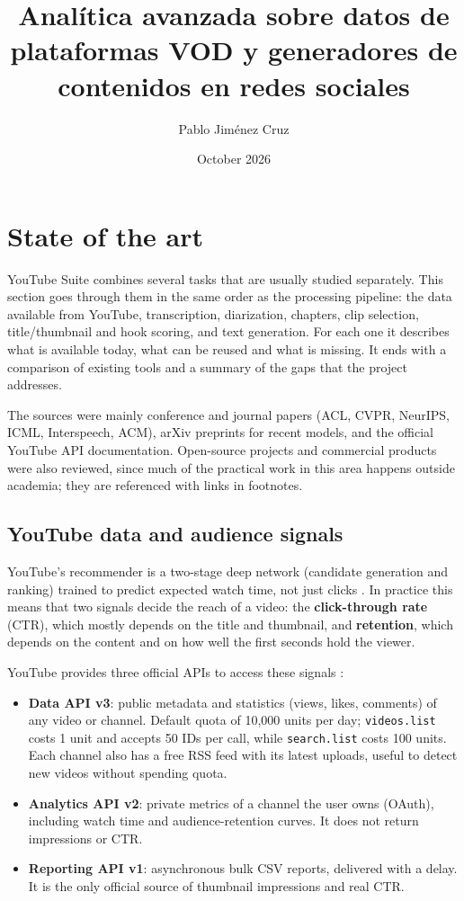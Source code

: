 \documentclass[ENG]{TFUOC}
\title{Analítica avanzada sobre datos de plataformas VOD y generadores de contenidos en redes sociales}
\author{Pablo Jiménez Cruz}
\date{October 2026}
\begin{document}
\estructura

\tableofcontents

\renewcommand{\thesection}{\arabic{section}}


\section{State of the art}
\label{s:soa}

YouTube Suite combines several tasks that are usually studied separately. This section goes through them in the same order as the processing pipeline: the data available from YouTube, transcription, diarization, chapters, clip selection, title/thumbnail and hook scoring, and text generation. For each one it describes what is available today, what can be reused and what is missing. It ends with a comparison of existing tools and a summary of the gaps that the project addresses.

The sources were mainly conference and journal papers (ACL, CVPR, NeurIPS, ICML, Interspeech, ACM), arXiv preprints for recent models, and the official YouTube API documentation. Open-source projects and commercial products were also reviewed, since much of the practical work in this area happens outside academia; they are referenced with links in footnotes.

\subsection{YouTube data and audience signals}
\label{ss:soa-data}

YouTube's recommender is a two-stage deep network (candidate generation and ranking) trained to predict expected watch time, not just clicks \cite{recommender_systems_streaming}. In practice this means that two signals decide the reach of a video: the \textbf{click-through rate} (CTR), which mostly depends on the title and thumbnail, and \textbf{retention}, which depends on the content and on how well the first seconds hold the viewer.

YouTube provides three official APIs to access these signals \cite{yt_data_api}:
\begin{itemize}
\item \textbf{Data API v3}: public metadata and statistics (views, likes, comments) of any video or channel. Default quota of 10{,}000 units per day; \texttt{videos.list} costs 1 unit and accepts 50 IDs per call, while \texttt{search.list} costs 100 units. Each channel also has a free RSS feed with its latest uploads, useful to detect new videos without spending quota.
\item \textbf{Analytics API v2}: private metrics of a channel the user owns (OAuth), including watch time and audience-retention curves. It does not return impressions or CTR.
\item \textbf{Reporting API v1}: asynchronous bulk CSV reports, delivered with a delay. It is the only official source of thumbnail impressions and real CTR.
\end{itemize}
\end{document}
